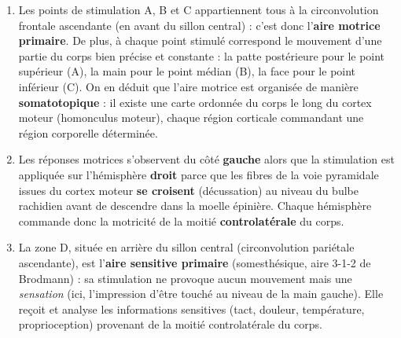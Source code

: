 \documentclass[11pt]{article}
\begin{document}
\begin{corrige}
\begin{enumerate}
\item Les points de stimulation A, B et C appartiennent tous à la circonvolution frontale ascendante (en avant du sillon central) : c'est donc l'\textbf{aire motrice primaire}. De plus, à chaque point stimulé correspond le mouvement d'une partie du corps bien précise et constante : la patte postérieure pour le point supérieur (A), la main pour le point médian (B), la face pour le point inférieur (C). On en déduit que l'aire motrice est organisée de manière \textbf{somatotopique} : il existe une carte ordonnée du corps le long du cortex moteur (homonculus moteur), chaque région corticale commandant une région corporelle déterminée.
\item Les réponses motrices s'observent du côté \textbf{gauche} alors que la stimulation est appliquée sur l'hémisphère \textbf{droit} parce que les fibres de la voie pyramidale issues du cortex moteur \textbf{se croisent} (décussation) au niveau du bulbe rachidien avant de descendre dans la moelle épinière. Chaque hémisphère commande donc la motricité de la moitié \textbf{controlatérale} du corps.
\item La zone D, située en arrière du sillon central (circonvolution pariétale ascendante), est l'\textbf{aire sensitive primaire} (somesthésique, aire 3-1-2 de Brodmann) : sa stimulation ne provoque aucun mouvement mais une \emph{sensation} (ici, l'impression d'être touché au niveau de la main gauche). Elle reçoit et analyse les informations sensitives (tact, douleur, température, proprioception) provenant de la moitié controlatérale du corps.
\end{enumerate}
\end{corrige}
\end{document}
